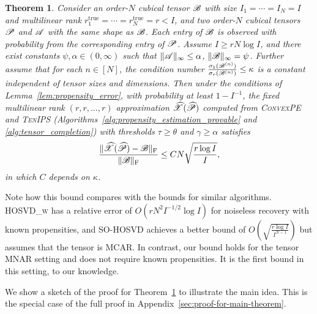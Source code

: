 \documentclass{article}
\newcommand{\T}[2][]{#1\mathscr{\MakeUppercase{#2}}}
\newcommand{\norm}[1]{\Vert #1 \Vert}
\newcommand{\fnorm}[1]{\norm{#1}_{\mathrm{F}}}
\newcommand{\maxnorm}[1]{\norm{#1}_{\infty}}
\theoremstyle{plain}
\newtheorem{theorem}{Theorem}
\begin{document}
\begin{theorem}
	\label{thm:main-theorem-informal}
	Consider an order-$N$ cubical tensor $\T{B}$ with size $I_1 = \cdots = I_N = I$ and multilinear rank $r_1^\mathrm{true} = \cdots = r_N^\mathrm{true} = r < I$, and two order-$N$ cubical tensors $\T{P}$ and $\T{A}$ with the same shape as $\T{B}$.
	Each entry of $\T{B}$ is observed with probability from the corresponding entry of $\T{P}$.
	Assume $I \geq r N \log I$, and there exist constants $\psi, \alpha \in (0,\infty)$ such that $\maxnorm{\T{A}} \leq \alpha$, $\maxnorm{\T{B}} = \psi$.
	Further assume that for each $n \in [N]$, the condition number $\frac{\sigma_{1} (\T{B}^{(n)})}{\sigma_r (\T{B}^{(n)})} \leq \kappa$ is a constant independent of tensor sizes and dimensions. Then under the conditions of Lemma~\ref{lem:propensity_error}, with probability at least $1 - I^{-1}$, the fixed multilinear rank $(r, r, \ldots, r)$ approximation $\widehat{\T{X}}(\widehat{\T{P}})$ computed from \textsc{ConvexPE} and \textsc{TenIPS} (Algorithms~\ref{alg:propensity_estimation_provable} and \ref{alg:tensor_completion}) with thresholds $\tau \geq \theta$ and $\gamma \geq \alpha$ satisfies
	\begin{equation}
		\label{eq:error-bound-informal}
		\frac{\fnorm{\widehat{\T{X}}(\widehat{\T{P}}) - \T{B}}}{\fnorm{\T{B}}} \leq C N \sqrt{\frac{r \log I}{I}},
	\end{equation}
	in which $C$ depends on $\kappa$.
\end{theorem}

Note how this bound compares with the bounds for similar algorithms.
\textsc{HOSVD\_w} has a relative error of $O(r N^2 I^{-1/2} \log I)$ \cite[Theorem 3.3]{huang2020hosvd} for noiseless recovery with known propensities, and \textsc{SO-HOSVD} achieves a better bound of $O(\sqrt{\frac{r \log I}{I^{N-1}}})$ \cite[Theorem 3]{xia2017statistically} but assumes that the tensor is MCAR. 
In contrast, our bound holds for the tensor MNAR setting and does not require known propensities.
It is the first bound in this setting, to our knowledge.

We show a sketch of the proof for Theorem~\ref{thm:main-theorem-informal} to illustrate the main idea.
This is the special case of the full proof in Appendix~\ref{sec:proof-for-main-theorem}.
\end{document}
